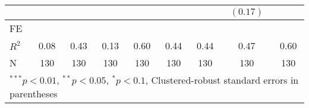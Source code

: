 \begin{tabular}{l c c c c c c c c }
                &              &          &              &               &          &          & $(0.17)$ &              \\
\hline
FE          &                &                &                &                &                &                &                &                \\ 
\hline
$R^2$           & 0.08         & 0.43     & 0.13         & 0.60          & 0.44     & 0.44     & 0.47     & 0.60         \\
N               & 130          & 130      & 130          & 130           & 130      & 130      & 130      & 130          \\
\hline
\multicolumn{9}{l}{\scriptsize{$^{***}p<0.01$, $^{**}p<0.05$, $^*p<0.1$, Clustered-robust standard errors in parentheses}}
\end{tabular}
